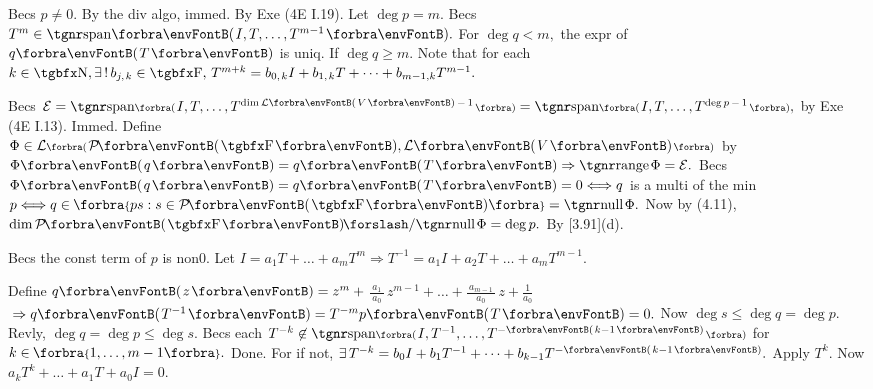 Becs $p\neq 0.$ By the div algo, immed.  \;\;\Or By Exe (4E I.19).\PfEnd\vspace{2pt}\parSol{}
\Or Let $\deg p=m.$ Becs $T^{m}\in\Span{I,T,\dots,T^{m-1}}.$ For $\deg q<m,$ the expr of $q\Par{T}$ is uniq.\parSol{}
If $\deg q\geqslant m.$ Note that for each $k\in\Nbb,\exists\,!\,b_{j,\;\!k}\in\Fbb,\,T^{m+k}=b_{0,\;\!k}I+b_{1,\;\!k}T+\dots+b_{m-1,k}T^{m-1}.$\PfEnd
\SepLine[0pt][\Blind{\BulletPointX} ]

Becs $\mE=\Span[\BigPar]{I,T,\dots,T^{\dim\Lm[\SmallPar]{V}\,-\,1}}=\Span[\BigPar]{I,T,\dots,T^{\deg p\,-\,1}},$ by Exe (4E I.13). Immed.\PfEnd\vspace{2pt}\parSol{}
\Or Define $\Phi\in\Lm[\BigPar]{\PoFi,\Lm{V}}$ by $\Phi\Par{q}=q\Par{T}\Rightarrow\range\Phi=\mE.$\parSol{}
Becs $\Phi\Par{q}=q\Par{T}=0\Longleftrightarrow q$ is a multi of the min $p\Longleftrightarrow q\in\;\!\!\Bra{ps:s\in\PoFi}=\null\Phi.$\parSol{}
Now by (4.11), $\dim\PoFi\XSlash\null\Phi=\deg p.$ By [3.91](d).\PfEnd
\SepLine[0pt][\Blind{\BulletPointX} ]

Becs the const term of $p$ is non0. Let $I=a_1T+\dots+a_mT^m\Rightarrow T^{-1}=a_1I+a_2T+\dots+a_mT^{m-1}.$\PfEnd
\SepLine[0pt][\Blind{\BulletPointX} ]

Define $q\Par{z}=z^m+{}${\Large$\frac{\:a_1\:}{a_0}$}$\,z^{m-1}+\dots+{}${\Large$\frac{\:a_{m-1}\:}{a_0}$}$\,z+{}${\Large$\frac{\:1\:}{a_0}$}${}\Rightarrow q\Par{T^{-1}}=T^{-m}p\Par{T}=0.$\vspace{2pt}\parSol{}
Now $\deg s\leqslant\deg q=\deg p.$ \;Revly, $\deg q=\deg p\leqslant\deg s.$\PfEnd\vspace{4pt}\parSol{}
\Or Becs each $T^{-k}\not\in\Span[\BigPar]{I,T^{-1},\dots,T^{-\SmallPar{k-1}}}$ for $k\in\;\!\!\Bra{1,\dots,m-1}.$ Done.\parSol{}
For if not, $\exists\,T^{-k}=b_0 I+b_1 T^{-1}+\dots+b_{k-1}T^{-\SmallPar{k-1}}.$ Apply $T^k.$ Now $a_kT^k+\dots+a_1T+a_0I=0.$\PfEnd
\SepLine[0pt][\Blind{\BulletPointX} ]
\pagebreak

